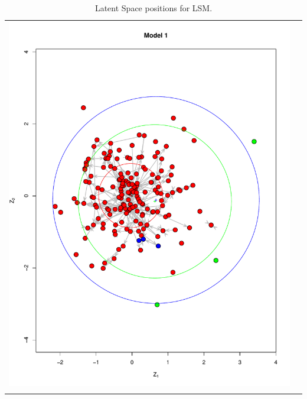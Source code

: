 \documentclass[fleqn,12pt]{wlscirep}
\begin{document}
\begin{longtable}[!h]{c@{\hskip 0cm}c}
\includegraphics[height=.75\textheight, clip=true, trim=.5cm .5cm 0cm .6cm]{figures/LSM_m1.pdf}   \\
\caption{\label{fig:LSM_plot_1} Latent Space positions for LSM.}
\end{longtable}
\end{document}
